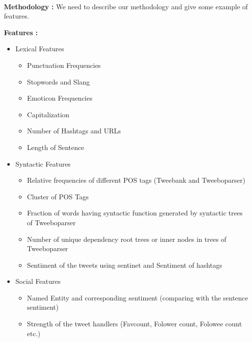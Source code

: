 \\

\noindent \textbf{Methodology :}
We need to describe our methodology and give some example of features.


\noindent \textbf{Features :}
\begin{itemize}
 \item Lexical Features
 \begin{itemize}
  \item Punctuation Frequencies
  \item Stopwords and Slang
  \item Emoticon Frequencies
  \item Capitalization
  \item Number of Hashtags and URLs
  \item Length of Sentence
 \end{itemize}

 \item Syntactic Features
  \begin{itemize}
  \item Relative frequencies of different POS tags (Tweebank and Tweeboparser)
  \item Cluster of POS Tags
  \item Fraction of words having syntactic function generated by syntactic trees of Tweeboparser
  \item Number of unique dependency root trees or inner nodes in trees of Tweeboparser
  \item Sentiment of the tweets using sentinet and Sentiment of hashtags
 \end{itemize}
 \item Social Features
  \begin{itemize}
  \item Named Entity and corresponding sentiment (comparing with the sentence sentiment)
  \item Strength of the tweet handlers (Favcount, Folower count, Folowee count etc.)
 \end{itemize}
\end{itemize}



